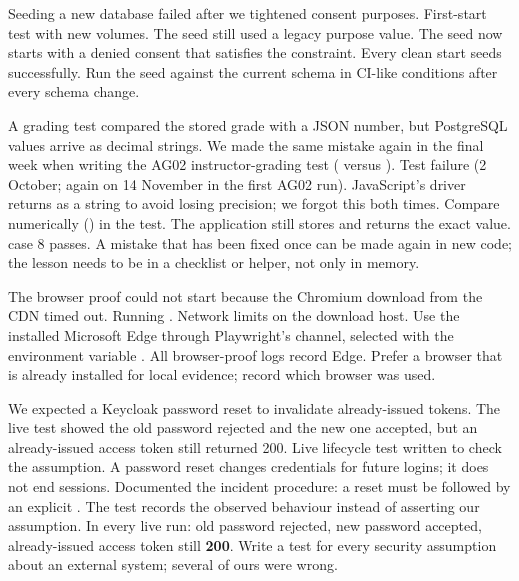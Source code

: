 {Seeding a new database failed after we tightened consent purposes.}
{First-start test with new volumes.}
{The seed still used a legacy purpose value.}
{The seed now starts with a denied  consent that satisfies the constraint.}
{Every clean start seeds successfully.}
{Run the seed against the current schema in CI-like conditions after every schema change.}

{A grading test compared the stored grade with a JSON number, but PostgreSQL  values arrive as decimal strings. We made the same mistake again in the final week when writing the AG02 instructor-grading test ( versus ).}
{Test failure (2 October; again on 14 November in the first AG02 run).}
{JavaScript's  driver returns  as a string to avoid losing precision; we forgot this both times.}
{Compare numerically () in the test. The application still stores and returns the exact value.}
{ case 8 passes.}
{A mistake that has been fixed once can be made again in new code; the lesson needs to be in a checklist or helper, not only in memory.}

{The browser proof could not start because the Chromium download from the CDN timed out.}
{Running .}
{Network limits on the download host.}
{Use the installed Microsoft Edge through Playwright's  channel, selected with the environment variable .}
{All browser-proof logs record Edge.}
{Prefer a browser that is already installed for local evidence; record which browser was used.}

{We expected a Keycloak password reset to invalidate already-issued tokens. The live test showed the old password rejected and the new one accepted, but an already-issued access token still returned 200.}
{Live lifecycle test written to check the assumption.}
{A password reset changes credentials for future logins; it does not end sessions.}
{Documented the incident procedure: a reset must be followed by an explicit . The test records the observed behaviour instead of asserting our assumption.}
{In every live run: old password rejected, new password accepted, already-issued access token still \textbf{200}.}
{Write a test for every security assumption about an external system; several of ours were wrong.}

